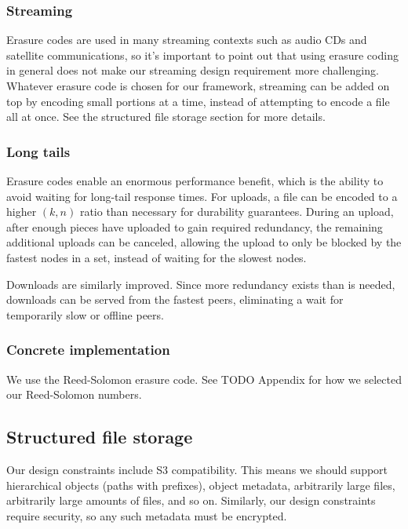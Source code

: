 \documentclass[a4paper,10pt]{article}
\newcommand{\todo}[1]{{\color{red} TODO #1}}
\begin{document}
\subsubsection{Streaming}

Erasure codes are used in many streaming contexts such as audio CDs and
satellite communications, so it's important to point out that using
erasure coding in general does not make our streaming design requirement
more challenging. Whatever erasure code is chosen for our framework, streaming
can be added on top by encoding small portions at a time, instead of
attempting to encode a file all at once. See the structured file storage
section for more details.

\subsubsection{Long tails}

Erasure codes enable an enormous performance benefit, which is the ability
to avoid waiting for long-tail response times.\cite{tail-at-scale} For uploads,
a file can be encoded to a higher $(k, n)$ ratio than necessary for durability
guarantees. During an upload, after enough pieces have uploaded to gain
required redundancy, the remaining additional uploads can be canceled, allowing
the upload to only be blocked by the fastest nodes in a set, instead of waiting
for the slowest nodes.

Downloads are similarly improved. Since more redundancy exists than is needed,
downloads can be served from the fastest peers, eliminating a wait for
temporarily slow or offline peers.

\subsubsection{Concrete implementation}

We use the Reed-Solomon erasure code. See \todo{Appendix} for how we selected
our Reed-Solomon numbers.

\subsection{Structured file storage}

Our design constraints include S3 compatibility. This means we should support
hierarchical objects (paths with prefixes), object metadata, arbitrarily large
files, arbitrarily large amounts of files, and so on. Similarly, our design
constraints require security, so any such metadata must be encrypted.
\end{document}
